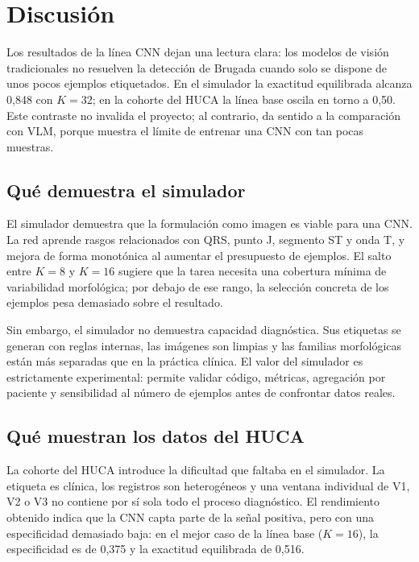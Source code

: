 \chapter{Discusión}
\label{chap:discusion}

Los resultados de la línea CNN dejan una lectura clara: los modelos de visión tradicionales no resuelven la detección de Brugada cuando solo se dispone de unos pocos ejemplos etiquetados. En el simulador la exactitud equilibrada alcanza 0,848 con \(K=32\); en la cohorte del HUCA la línea base oscila en torno a 0,50. Este contraste no invalida el proyecto; al contrario, da sentido a la comparación con VLM, porque muestra el límite de entrenar una CNN con tan pocas muestras.

\section{Qué demuestra el simulador}

El simulador demuestra que la formulación como imagen es viable para una CNN. La red aprende rasgos relacionados con QRS, punto J, segmento ST y onda T, y mejora de forma monotónica al aumentar el presupuesto de ejemplos. El salto entre \(K=8\) y \(K=16\) sugiere que la tarea necesita una cobertura mínima de variabilidad morfológica; por debajo de ese rango, la selección concreta de los ejemplos pesa demasiado sobre el resultado.

Sin embargo, el simulador no demuestra capacidad diagnóstica. Sus etiquetas se generan con reglas internas, las imágenes son limpias y las familias morfológicas están más separadas que en la práctica clínica. El valor del simulador es estrictamente experimental: permite validar código, métricas, agregación por paciente y sensibilidad al número de ejemplos antes de confrontar datos reales.

\section{Qué muestran los datos del HUCA}

La cohorte del HUCA introduce la dificultad que faltaba en el simulador. La etiqueta es clínica, los registros son heterogéneos y una ventana individual de V1, V2 o V3 no contiene por sí sola todo el proceso diagnóstico. El rendimiento obtenido indica que la CNN capta parte de la señal positiva, pero con una especificidad demasiado baja: en el mejor caso de la línea base (\(K=16\)), la especificidad es de 0,375 y la exactitud equilibrada de 0,516.

